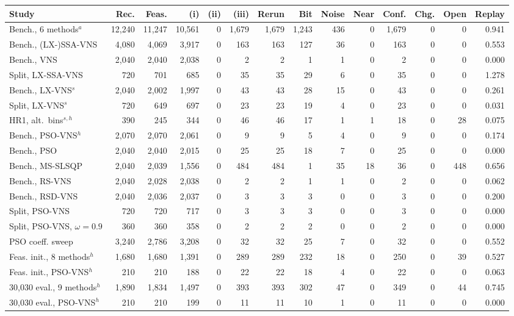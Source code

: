 \begin{table}[!htbp]
\begin{tabular}{lrrrrrrrrrrrrr}
Study & Rec. & Feas. & (i) & (ii) & (iii) & Rerun & Bit & Noise & Near & Conf. & Chg. & Open & Replay \\
\midrule
Bench., 6 methods$^a$ & 12,240 & 11,247 & 10,561 & 0 & 1,679 & 1,679 & 1,243 & 436 & 0 & 1,679 & 0 & 0 & 0.941 \\
Bench., (LX-)SSA-VNS & 4,080 & 4,069 & 3,917 & 0 & 163 & 163 & 127 & 36 & 0 & 163 & 0 & 0 & 0.553 \\
Bench., VNS & 2,040 & 2,040 & 2,038 & 0 & 2 & 2 & 1 & 1 & 0 & 2 & 0 & 0 & 0.000 \\
Split, LX-SSA-VNS & 720 & 701 & 685 & 0 & 35 & 35 & 29 & 6 & 0 & 35 & 0 & 0 & 1.278 \\
Bench., LX-VNS$^s$ & 2,040 & 2,002 & 1,997 & 0 & 43 & 43 & 28 & 15 & 0 & 43 & 0 & 0 & 0.261 \\
Split, LX-VNS$^s$ & 720 & 649 & 697 & 0 & 23 & 23 & 19 & 4 & 0 & 23 & 0 & 0 & 0.031 \\
HR1, alt.\ bins$^{s,h}$ & 390 & 245 & 344 & 0 & 46 & 46 & 17 & 1 & 1 & 18 & 0 & 28 & 0.075 \\
Bench., PSO-VNS$^h$ & 2,070 & 2,070 & 2,061 & 0 & 9 & 9 & 5 & 4 & 0 & 9 & 0 & 0 & 0.174 \\
Bench., PSO & 2,040 & 2,040 & 2,015 & 0 & 25 & 25 & 18 & 7 & 0 & 25 & 0 & 0 & 0.000 \\
Bench., MS-SLSQP & 2,040 & 2,039 & 1,556 & 0 & 484 & 484 & 1 & 35 & 18 & 36 & 0 & 448 & 0.656 \\
Bench., RS-VNS & 2,040 & 2,028 & 2,038 & 0 & 2 & 2 & 1 & 1 & 0 & 2 & 0 & 0 & 0.062 \\
Bench., RSD-VNS & 2,040 & 2,036 & 2,037 & 0 & 3 & 3 & 3 & 0 & 0 & 3 & 0 & 0 & 0.200 \\
Split, PSO-VNS & 720 & 720 & 717 & 0 & 3 & 3 & 3 & 0 & 0 & 3 & 0 & 0 & 0.000 \\
Split, PSO-VNS, $\omega=0.9$ & 360 & 360 & 358 & 0 & 2 & 2 & 2 & 0 & 0 & 2 & 0 & 0 & 0.000 \\
PSO coeff. sweep & 3,240 & 2,786 & 3,208 & 0 & 32 & 32 & 25 & 7 & 0 & 32 & 0 & 0 & 0.552 \\
Feas. init., 8 methods$^h$ & 1,680 & 1,680 & 1,391 & 0 & 289 & 289 & 232 & 18 & 0 & 250 & 0 & 39 & 0.527 \\
Feas. init., PSO-VNS$^h$ & 210 & 210 & 188 & 0 & 22 & 22 & 18 & 4 & 0 & 22 & 0 & 0 & 0.063 \\
30,030 eval., 9 methods$^h$ & 1,890 & 1,834 & 1,497 & 0 & 393 & 393 & 302 & 47 & 0 & 349 & 0 & 44 & 0.745 \\
30,030 eval., PSO-VNS$^h$ & 210 & 210 & 199 & 0 & 11 & 11 & 10 & 1 & 0 & 11 & 0 & 0 & 0.000 \\

\end{tabular}
\end{table}

